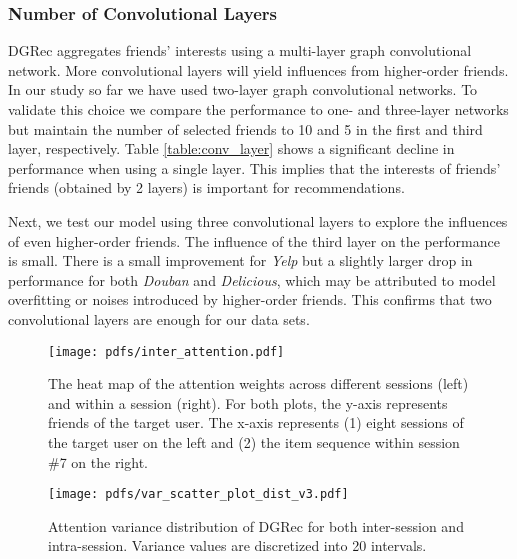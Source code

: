 \documentclass[sigconf]{acmart}
\begin{document}
\subsubsection{Number of Convolutional Layers}
\gls{DGRec} aggregates friends' interests using a multi-layer graph convolutional network. More convolutional layers will yield influences from higher-order friends. In our study so far we have used two-layer graph convolutional networks. 
To validate this choice we compare the performance to one- and three-layer networks but maintain the number of selected friends to 10 and 5 in the first and third layer, respectively.
Table \ref{table:conv_layer} shows a significant decline in performance when using a single layer. This implies that the interests of friends' friends 
(obtained by 2 layers) 
is important for recommendations. 

Next, we test our model using three convolutional layers to explore the influences of even higher-order friends. The influence of the third layer on the performance is small. There is a small improvement for \textit{Yelp} but a slightly larger drop in performance for both \textit{Douban} and \textit{Delicious}, which may be attributed to
model overfitting or noises introduced by higher-order friends. This confirms that two convolutional layers are enough for our data sets.


\begin{figure}
\centering
\vspace{-8pt}
\texttt{[image: pdfs/inter\_attention.pdf]}
\vspace{-8pt}
\caption{The heat map of the attention weights across different sessions (left) and within a session (right). For both plots, the y-axis represents friends of the target user. The x-axis represents (1) eight sessions of the target user on the left and (2) the item sequence within session \#7 on the right.}
\label{fig:attention}
\end{figure}

\begin{figure}
\centering
\vspace{-8pt}
\texttt{[image: pdfs/var\_scatter\_plot\_dist\_v3.pdf]}
\vspace{-8pt}
\caption{Attention variance distribution of \gls{DGRec} for both inter-session and intra-session. Variance values are discretized into 20 intervals.}
\vspace{-10pt}
\label{fig:attention_var}
\end{figure}
\end{document}
